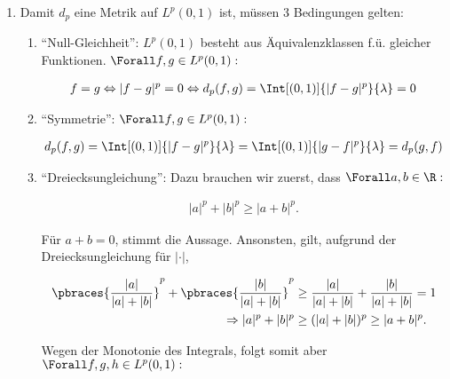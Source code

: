 \begin{solution}

\phantom{}

\begin{enumerate}[label = (\alph*)]

  \item
  Damit $d_p$ eine Metrik auf $L^p(0, 1)$ ist, müssen 3 Bedingungen gelten:

  \begin{enumerate}[label = (\roman*)]

    \item
    \enquote{Null-Gleichheit}:
    $L^p(0, 1)$ besteht aus Äquivalenzklassen f.ü. gleicher Funktionen. $\Forall f, g \in L^p(0, 1):$

    \begin{align*}
      f = g
      \Leftrightarrow
      |f - g|^p = 0
      \Leftrightarrow
      d_p(f, g)
      =
      \Int[(0, 1)]{|f - g|^p}{\lambda} = 0
    \end{align*}

    \item
    \enquote{Symmetrie}:
    $\Forall f, g \in L^p(0, 1):$

    \begin{align*}
      d_p(f, g)
      =
      \Int[(0, 1)]{|f - g|^p}{\lambda}
      =
      \Int[(0, 1)]{|g - f|^p}{\lambda}
      =
      d_p(g, f)
    \end{align*}

    \item
    \enquote{Dreiecksungleichung}:
    Dazu brauchen wir zuerst, dass $\Forall a, b \in \R:$

    \begin{align*}
      |a|^p + |b|^p \geq |a + b|^p.
    \end{align*}

    Für $a + b = 0$, stimmt die Aussage.
    Ansonsten, gilt, aufgrund der Dreiecksungleichung für $|\cdot|$,

    \begin{align*}
      \pbraces{\frac{|a|}{|a| + |b|}}^p +
      \pbraces{\frac{|b|}{|a| + |b|}}^p
      & \geq
      \frac{|a|}{|a| + |b|} +
      \frac{|b|}{|a| + |b|} = 1 \\
      \Rightarrow
      |a|^p + |b|^p
      & \geq
      (|a| + |b|)^p
      \geq
      |a + b|^p.
    \end{align*}

    Wegen der Monotonie des Integrals, folgt somit aber $\Forall f, g, h \in L^p(0, 1):$


\end{enumerate}
\end{enumerate}
\end{solution}
